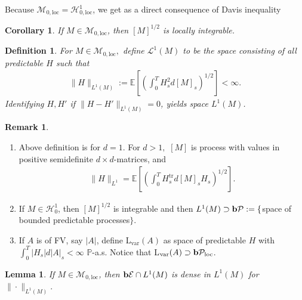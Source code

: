 \documentclass[12pt,a4paper, twoside]{article}
\newtheorem{lem}{Lemma}[section]
\newtheorem{cor}{Corollary}[section]
\newtheorem{defn}{Definition}[section]
\theoremstyle{definition}
\newtheorem{rem}{Remark}[section]
\newcommand{\EE}{\mathbb{E}} %
\newcommand{\PP}{\mathbb{P}} %
\newcommand{\simple}{\textbf{\text{b}}\mathcal{E}}
\newcommand{\pred}{\textbf{\text{b}}\mathcal{P}}
\begin{document}
Because $\mathcal{M}_{0, \text{loc}} = \mathcal{H}_{0, \text{loc}}^1$, we get as a direct consequence of Davis inequality
\begin{cor}\label{C38} If $M \in \mathcal{M}_{0, \text{loc}}$, then $[M]^{1/2}$ is locally integrable. 
\end{cor}
\newpage
\begin{defn} For $M \in \mathcal{M}_{0,\text{loc}},$ define $ \mathcal{L}^1(M)$ to be the space consisting of all predictable $H$ such that
\begin{align*}
\|H\|_{L^1(M)} := \EE \left[ \left( \int_0^T H_s^2 d[M]_s \right)^{1/2} \right] < \infty.
\end{align*}
Identifying $H, H'$ if $\|H-H'\|_{L^1(M)} =0$, yields space $L^1(M)$.  
\end{defn}
\begin{rem} \
\begin{enumerate}
\item Above definition is for $d=1$. For $d>1,$ $[M]$ is process with values in positive semidefinite $d\times d$-matrices, and 
\begin{align*}
\|H\|_{L^1 } = \EE \left[ \left( \int_0^T H_s^\text{tr} d[M]_sH_s \right)^{1/2} \right]. 
\end{align*}
\item If $M \in \mathcal{H}_0^1$, then $[M]^{1/2}$ is integrable and then $L^1 (M) \supset \pred:= \{$space of bounded predictable processes$\}$.
\item If $A$ is of FV, say $|A|$, define L$_\text{var}(A)$ as space of predictable $H$ with $\int_0^T |H_s| d |A|_s < \infty $ $\PP$-a.s. Notice that L$_\text{var}(A) \supset \pred_\text{loc}$. 
\end{enumerate}
\end{rem}
\begin{lem} \label{L39} If $M \in \mathcal{M}_{0, \text{loc}}$, then $\simple \cap L^1(M)$ is dense in $L^1(M)$ for $\| \cdot \|_{L^1(M)}. $
\end{lem}
\end{document}

